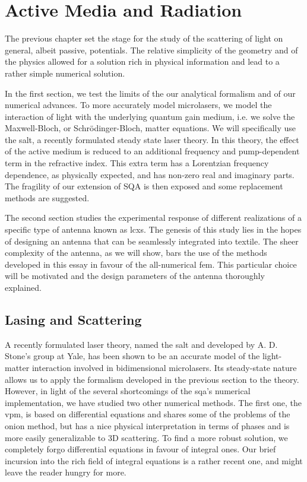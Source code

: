 \chapter{Active Media and Radiation}
The previous chapter set the stage for the study of 
the scattering of light on general, albeit passive, 
potentials. The relative simplicity of the geometry
and of the physics allowed for a solution rich 
in physical information and lead to a rather simple
numerical solution. 

In the first section, we test the limits of the our analytical formalism
and of our numerical advances. To more accurately model
microlasers, we model the interaction of light with the underlying
quantum gain medium, i.e. we solve the Maxwell-Bloch, or Schrödinger-Bloch, 
matter equations. We will specifically use the \gls{salt}, a recently 
formulated steady state laser theory. In this theory, the effect 
of the active medium is reduced to an additional frequency and pump-dependent
term in the refractive index. This extra term has a Lorentzian frequency
dependence, as physically expected, and has non-zero real and imaginary
parts. The fragility of our extension of SQA is then exposed and some replacement
methods are suggested. 


The second section studies the experimental response
of different realizations of a specific type of antenna
known as \glspl{lcx}. The genesis of this study lies in
the hopes of designing an antenna that can be seamlessly
integrated into textile. The sheer complexity of the
antenna, as we will show, bars the use of the methods developed
in this essay in favour of the all-numerical \gls{fem}. 
This particular choice will be motivated and the design 
parameters of the antenna thoroughly explained. 

\section{Lasing and Scattering}
A recently formulated laser theory, named the 
\gls{salt} and developed by A. D. Stone's group
at Yale, has been shown to be an accurate model 
of the light-matter interaction involved in bidimensional
microlasers. Its steady-state nature allows us to apply
the formalism developed in the previous section 
to the theory. However, in light of the several shortcomings
of the \gls{sqa}'s numerical implementation, we have studied 
two other numerical methods. The first one, the \gls{vpm}, is based on 
differential equations and shares some of the problems of 
the onion method, but has a nice physical interpretation
in terms of phases and is more easily generalizable to 
3D scattering. 
To find a more robust solution, we completely forgo 
differential equations in favour of integral ones. 
Our brief incursion into the rich field of integral equations
is a rather recent one, and might leave the reader hungry for more.

